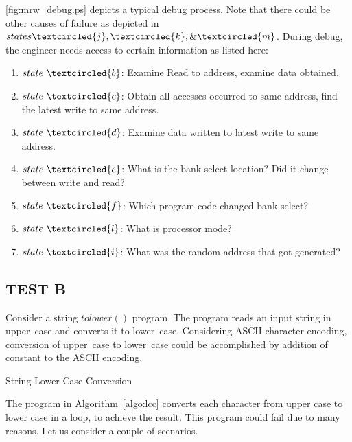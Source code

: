 \figurename{\ref{fig:mrw_debug.ps}} depicts a typical debug process. Note that there could be other causes of failure as depicted in $states \textcircled{j}, \textcircled{k}, \& \textcircled{m}$. During debug, the engineer needs access to certain information as listed here:
\begin{enumerate}
\item $state~\textcircled{b}$: Examine Read to address, examine data obtained.
\item $state~\textcircled{c}$: Obtain all accesses occurred to same address, find the latest write to same address.
\item $state~\textcircled{d}$: Examine data written to latest write to same address.
\item $state~\textcircled{e}$: What is the bank select location? Did it change between write and read?
\item $state~\textcircled{f}$: Which program code changed bank select?
\item $state~\textcircled{l}$: What is processor mode?
\item $state~\textcircled{i}$: What was the random address that got generated?
\end{enumerate}

\subsection {TEST B}
\label{case:testb}
Consider a string $tolower()$ program. The program reads an input string in upper~case and converts it to lower~case. Considering ASCII character encoding, conversion of upper~case to lower~case could be accomplished by addition of constant to the ASCII encoding.



\IncMargin{1em}
\begin{algorithm}[h]
\DontPrintSemicolon
{}

\BlankLine
 \caption{String Lower Case Conversion}
\label{algo:lcc}
\end{algorithm}\DecMargin{1em}


The program in Algorithm~\ref{algo:lcc} converts each character from upper case to lower case in a loop, to achieve the result. This program could fail due to many reasons. Let us consider a couple of scenarios.

